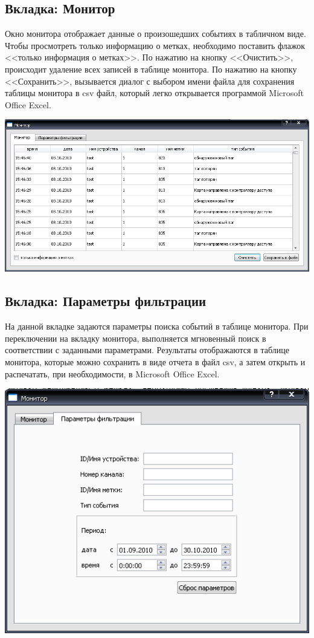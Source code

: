 ﻿\subsection{Вкладка: Монитор}

Окно монитора отображает данные о произошедших событиях в табличном виде.
Чтобы просмотреть только информацию о метках, необходимо поставить флажок <<только информация о метках>>.
По нажатию на кнопку <<Очистить>>, происходит удаление всех записей в таблице монитора.
По нажатию на кнопку <<Сохранить>>, вызывается диалог с выбором имени файла для сохранения таблицы монитора в
csv файл, который легко открывается программой Microsoft Office Excel.

\begin{center}
    \includegraphics[scale=0.5]{img/monitor.png}
\end{center}

\subsection{Вкладка: Параметры фильтрации}

На данной вкладке задаются параметры поиска событий в таблице монитора. 
При переключении на вкладку монитора, выполняется мгновенный поиск в соответствии с заданными параметрами.
Результаты отображаются в таблице монитора, которые можно сохранить в виде отчета в файл csv, а затем открыть и распечатать,
при необходимости, в Microsoft Office Excel.

\begin{center}
    \includegraphics[scale=0.5]{img/monitor_find.png}
\end{center}